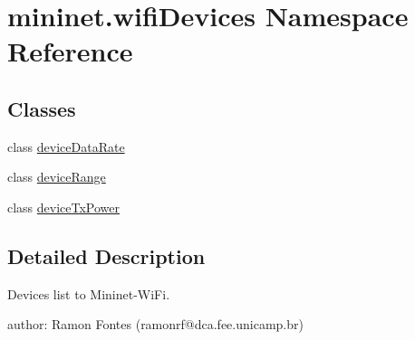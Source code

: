 \hypertarget{namespacemininet_1_1wifiDevices}{\section{mininet.\-wifi\-Devices Namespace Reference}
\label{namespacemininet_1_1wifiDevices}
}
\subsection*{Classes}
\begin{DoxyCompactItemize}
\item 
class \hyperlink{classmininet_1_1wifiDevices_1_1deviceDataRate}{device\-Data\-Rate}
\item 
class \hyperlink{classmininet_1_1wifiDevices_1_1deviceRange}{device\-Range}
\item 
class \hyperlink{classmininet_1_1wifiDevices_1_1deviceTxPower}{device\-Tx\-Power}
\end{DoxyCompactItemize}


\subsection{Detailed Description}
\begin{DoxyVerb}Devices list to Mininet-WiFi.

author: Ramon Fontes (ramonrf@dca.fee.unicamp.br)\end{DoxyVerb}
 